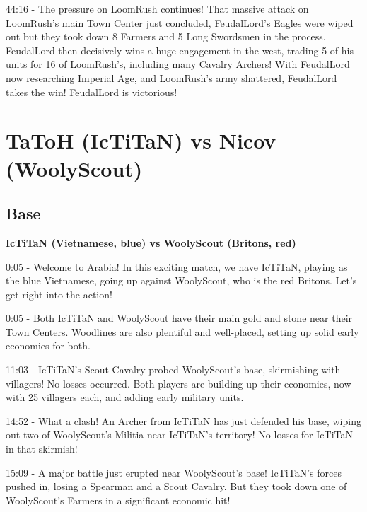 44:16 - The pressure on LoomRush continues! That massive attack on LoomRush's main Town Center just concluded, FeudalLord's Eagles were wiped out but they took down 8 Farmers and 5 Long Swordsmen in the process. FeudalLord then decisively wins a huge engagement in the west, trading 5 of his units for 16 of LoomRush's, including many Cavalry Archers! With FeudalLord now researching Imperial Age, and LoomRush's army shattered, FeudalLord takes the win! FeudalLord is victorious! \par \vspace{1em}

\section{TaToH (IcTiTaN) vs Nicov (WoolyScout)}
\label{appendix:tatoh-nicov}
\subsection{Base}
\textbf{IcTiTaN (Vietnamese, blue) vs WoolyScout (Britons, red)}

0:05 - Welcome to Arabia! In this exciting match, we have IcTiTaN, playing as the blue Vietnamese, going up against WoolyScout, who is the red Britons. Let's get right into the action! \par \vspace{1em}

0:05 - Both IcTiTaN and WoolyScout have their main gold and stone near their Town Centers. Woodlines are also plentiful and well-placed, setting up solid early economies for both. \par \vspace{1em}

11:03 - IcTiTaN's Scout Cavalry probed WoolyScout's base, skirmishing with villagers! No losses occurred. Both players are building up their economies, now with 25 villagers each, and adding early military units. \par \vspace{1em}

14:52 - What a clash! An Archer from IcTiTaN has just defended his base, wiping out two of WoolyScout's Militia near IcTiTaN's territory! No losses for IcTiTaN in that skirmish! \par \vspace{1em}

15:09 - A major battle just erupted near WoolyScout's base! IcTiTaN's forces pushed in, losing a Spearman and a Scout Cavalry. But they took down one of WoolyScout's Farmers in a significant economic hit! \par \vspace{1em}

